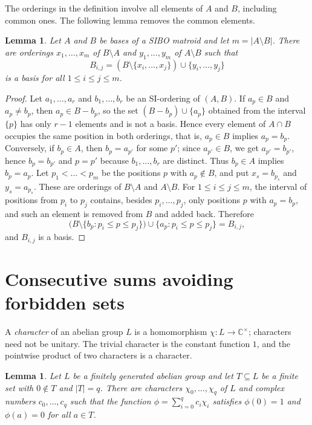 \documentclass{amsart}
\newtheorem{lemma}[theorem]{Lemma}
\theoremstyle{definition}
\theoremstyle{remark}
\newcommand{\C}{\mathbb{C}}
\begin{document}
The orderings in the definition involve all elements of $A$ and $B$, including common ones. The following lemma removes the common elements.

\begin{lemma}\label{lem:reduce}
Let $A$ and $B$ be bases of a SIBO matroid and let $m=|A\setminus B|$. There are orderings $x_1,\dots,x_m$ of $B\setminus A$ and $y_1,\dots,y_m$ of $A\setminus B$ such that
\[
B_{i,j}=(B\setminus\{x_i,\dots,x_j\})\cup\{y_i,\dots,y_j\}
\]
is a basis for all $1\le i\le j\le m$.
\end{lemma}

\begin{proof}
Let $a_1,\dots,a_r$ and $b_1,\dots,b_r$ be an SI-ordering of $(A,B)$. If $a_p\in B$ and $a_p\ne b_p$, then $a_p\in B-b_p$, so the set $(B-b_p)\cup\{a_p\}$ obtained from the interval $\{p\}$ has only $r-1$ elements and is not a basis. Hence every element of $A\cap B$ occupies the same position in both orderings, that is, $a_p\in B$ implies $a_p=b_p$. Conversely, if $b_p\in A$, then $b_p=a_{p'}$ for some $p'$; since $a_{p'}\in B$, we get $a_{p'}=b_{p'}$, hence $b_p=b_{p'}$ and $p=p'$ because $b_1,\dots,b_r$ are distinct. Thus $b_p\in A$ implies $b_p=a_p$. Let $p_1<\dots<p_m$ be the positions $p$ with $a_p\notin B$, and put $x_s=b_{p_s}$ and $y_s=a_{p_s}$. These are orderings of $B\setminus A$ and $A\setminus B$. For $1\le i\le j\le m$, the interval of positions from $p_i$ to $p_j$ contains, besides $p_i,\dots,p_j$, only positions $p$ with $a_p=b_p$, and such an element is removed from $B$ and added back. Therefore
\[
\bigl(B\setminus\{b_p: p_i\le p\le p_j\}\bigr)\cup\{a_p: p_i\le p\le p_j\}=B_{i,j},
\]
and $B_{i,j}$ is a basis.
\end{proof}

\section{Consecutive sums avoiding forbidden sets}\label{sec:interval}

A \emph{character} of an abelian group $L$ is a homomorphism $\chi\colon L\to\C^\times$; characters need not be unitary. The trivial character is the constant function $1$, and the pointwise product of two characters is a character.

\begin{lemma}\label{lem:interpolation}
Let $L$ be a finitely generated abelian group and let $T\subseteq L$ be a finite set with $0\notin T$ and $|T|=q$. There are characters $\chi_0,\dots,\chi_q$ of $L$ and complex numbers $c_0,\dots,c_q$ such that the function $\phi=\sum_{i=0}^q c_i\chi_i$ satisfies $\phi(0)=1$ and $\phi(a)=0$ for all $a\in T$.
\end{lemma}
\end{document}

